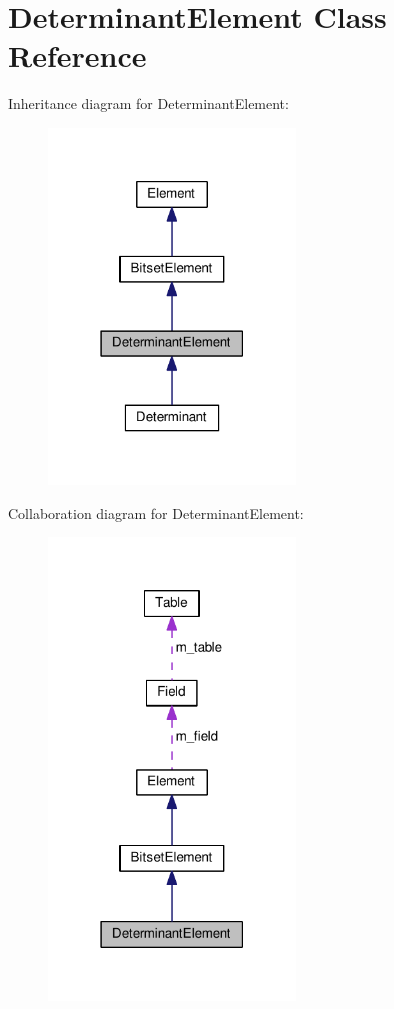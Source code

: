 \hypertarget{classDeterminantElement}{}\section{Determinant\+Element Class Reference}
\label{classDeterminantElement}


Inheritance diagram for Determinant\+Element\+:
\nopagebreak
\begin{figure}[H]
\begin{center}
\leavevmode
\includegraphics[width=186pt]{classDeterminantElement__inherit__graph}
\end{center}
\end{figure}


Collaboration diagram for Determinant\+Element\+:
\nopagebreak
\begin{figure}[H]
\begin{center}
\leavevmode
\includegraphics[width=186pt]{classDeterminantElement__coll__graph}
\end{center}
\end{figure}
